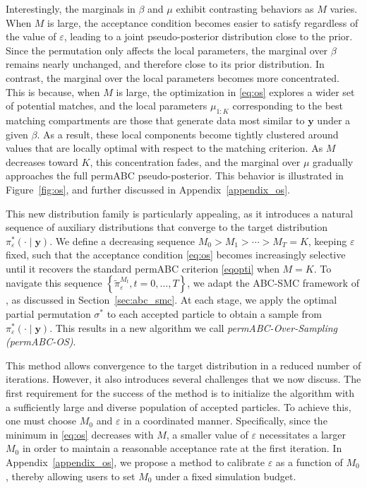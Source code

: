 \documentclass[lineno]{biometrika}
\def\globparam{\beta}
\def\locparam{\mu}
\def\obsdata{\mathbf{y}}
\begin{document}
Interestingly, the marginals in $\globparam$ and $\locparam$ exhibit contrasting behaviors as $M$ varies. When $M$ is large, the acceptance condition becomes easier to satisfy regardless of the value of $\varepsilon$, leading to a joint pseudo-posterior distribution close to the prior. Since the permutation only affects the local parameters, the marginal over $\globparam$ remains nearly unchanged, and therefore close to its prior distribution. In contrast, the marginal over the local parameters becomes more concentrated. This is because, when $M$ is large, the optimization in \eqref{eq:os} explores a wider set of potential matches, and the local parameters $\locparam_{1:K}$ corresponding to the best matching compartments are those that generate data most similar to $\obsdata$ under a given $\globparam$. As a result, these local components become tightly clustered around values that are locally optimal with respect to the matching criterion. As $M$ decreases toward $K$, this concentration fades, and the marginal over $\locparam$ gradually approaches the full permABC pseudo-posterior. This behavior is illustrated in Figure~\ref{fig:os}, and further discussed in Appendix~\ref{appendix_os}.

This new distribution family is particularly appealing, as it introduces a natural sequence of auxiliary distributions that converge to the target distribution \( \pi_\varepsilon^*(\cdot \mid \obsdata) \). We define a decreasing sequence \( M_0 > M_1 > \cdots > M_T = K \), keeping \( \varepsilon \) fixed, such that the acceptance condition \eqref{eq:os} becomes increasingly selective until it recovers the standard permABC criterion \eqref{eqopti} when \( M = K \). 
To navigate this sequence \( \left \{\tilde{\pi}_\varepsilon^{M_t}, t = 0, \dots, T \right\} \), we adapt the ABC-SMC framework of \citet{delmoralAdaptiveSequentialMonte2012}, as discussed in Section~\ref{sec:abc_smc}. At each stage, we apply the optimal partial permutation \( \sigma^* \) to each accepted particle to obtain a sample from \( \pi_\varepsilon^*(\cdot \mid \obsdata) \). This results in a new algorithm we call \emph{permABC-Over-Sampling (permABC-OS)}.

This method  allows convergence to the target distribution in a reduced number of iterations. However, it also introduces several challenges that we now discuss. The first requirement for the success of the method is to initialize the algorithm with a sufficiently large and diverse population of accepted particles. To achieve this, one must choose $M_0$ and $\varepsilon$ in a coordinated manner. Specifically, since the minimum in \eqref{eq:os} decreases with $M$, a smaller value of $\varepsilon$ necessitates a larger $M_0$ in order to maintain a reasonable acceptance rate at the first iteration. In Appendix~\ref{appendix_os}, we propose a method to calibrate $\varepsilon$ as a function of $M_0$, thereby allowing users to set $M_0$ under a fixed simulation budget.
\end{document}
